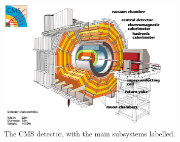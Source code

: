%


\begin{figure}[htbp]
  \begin{center}
  \includegraphics[width=0.8\textwidth]{Figures/detector/CMSlabelled}
  \caption{The \ac{CMS} detector, with the main subsystems labelled.
}
  \label{fig:CMS}
  \end{center}
\end{figure}

